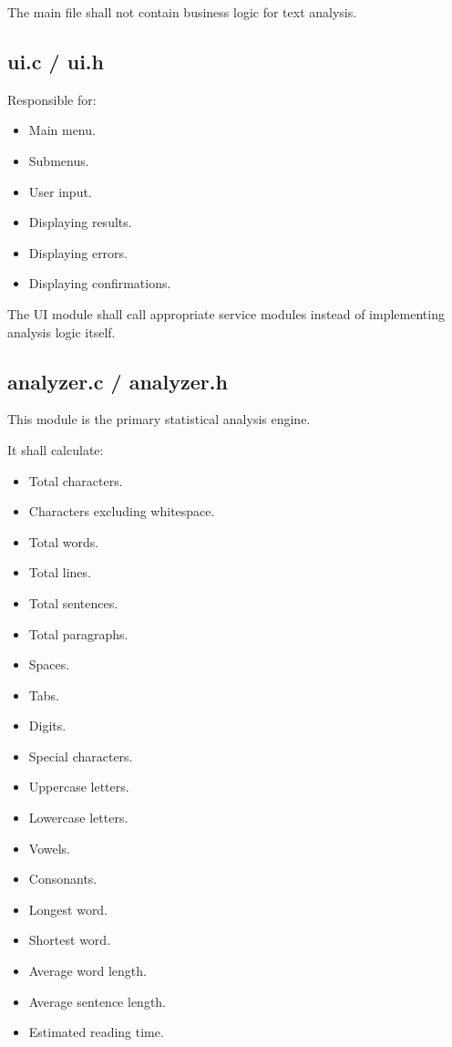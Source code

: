 \documentclass[12pt,a4paper]{article}
\begin{document}
The main file shall not contain business logic for text analysis.

\subsection{ui.c / ui.h}

Responsible for:

\begin{itemize}
    \item Main menu.
    \item Submenus.
    \item User input.
    \item Displaying results.
    \item Displaying errors.
    \item Displaying confirmations.
\end{itemize}

The UI module shall call appropriate service modules instead of
implementing analysis logic itself.

\subsection{analyzer.c / analyzer.h}

This module is the primary statistical analysis engine.

It shall calculate:

\begin{itemize}
    \item Total characters.
    \item Characters excluding whitespace.
    \item Total words.
    \item Total lines.
    \item Total sentences.
    \item Total paragraphs.
    \item Spaces.
    \item Tabs.
    \item Digits.
    \item Special characters.
    \item Uppercase letters.
    \item Lowercase letters.
    \item Vowels.
    \item Consonants.
    \item Longest word.
    \item Shortest word.
    \item Average word length.
    \item Average sentence length.
    \item Estimated reading time.
\end{itemize}
\end{document}
